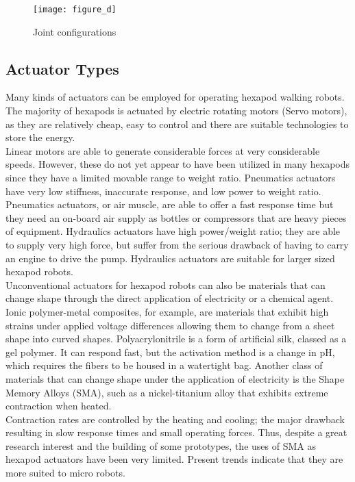 \begin{figure}[h]
	\centering
	\texttt{[image: figure\_d]}
	\caption{Joint configurations}
	\label{figure d.png}
\end{figure}

\subsection{Actuator Types}
Many kinds of actuators can be employed for operating hexapod walking robots. The majority of hexapods is actuated by electric rotating motors (Servo motors), as they are relatively cheap, easy to control and there are suitable technologies to store the energy.\\ 
Linear motors are able to generate considerable forces at very considerable speeds. However, these do not yet appear to have been utilized in many hexapods since they have a limited movable range to weight ratio. Pneumatics actuators have very low stiffness, inaccurate response, and low power to weight ratio. Pneumatics actuators, or air muscle, are able to offer a fast response time but they need an on-board air supply as bottles or compressors that are heavy pieces of equipment. Hydraulics actuators have high power/weight ratio; they are able to supply very high force, but suffer from the serious drawback of having to carry an engine to drive the pump. Hydraulics actuators are suitable for larger sized hexapod robots.\\
Unconventional actuators for hexapod robots can also be materials that can change shape through the direct application of electricity or a chemical agent. Ionic polymer-metal composites, for example, are materials that exhibit high strains under applied voltage differences allowing them to change from a sheet shape into curved shapes. Polyacrylonitrile is a form of artificial silk, classed as a gel polymer. It can respond fast, but the activation method is a change in pH, which requires the fibers to be housed in a watertight bag. Another class of materials that can change shape under the application of electricity is the Shape Memory Alloys (SMA), such as a nickel-titanium alloy that exhibits extreme contraction when heated.\\
Contraction rates are controlled by the heating and cooling; the major drawback resulting in slow response times and small operating forces. Thus, despite a great research interest and the building of some prototypes, the uses of SMA as hexapod actuators have been very limited. Present trends indicate that they are more suited to micro robots.


